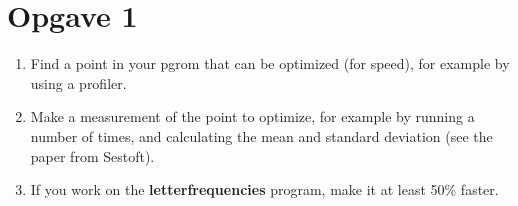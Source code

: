 \documentclass[class=report, crop=false]{standalone}
\begin{document}
    \section{Opgave 1}
    \begin{enumerate}
        \item Find a point in your pgrom that can be optimized (for speed), for example by using a profiler.
        \item Make a measurement of the point to optimize, for example by running a number of times, and calculating the mean and standard deviation (see the paper from Sestoft).
        \item If you work on the \textbf{letterfrequencies} program, make it at least 50\% faster.
    \end{enumerate}
\end{document}
